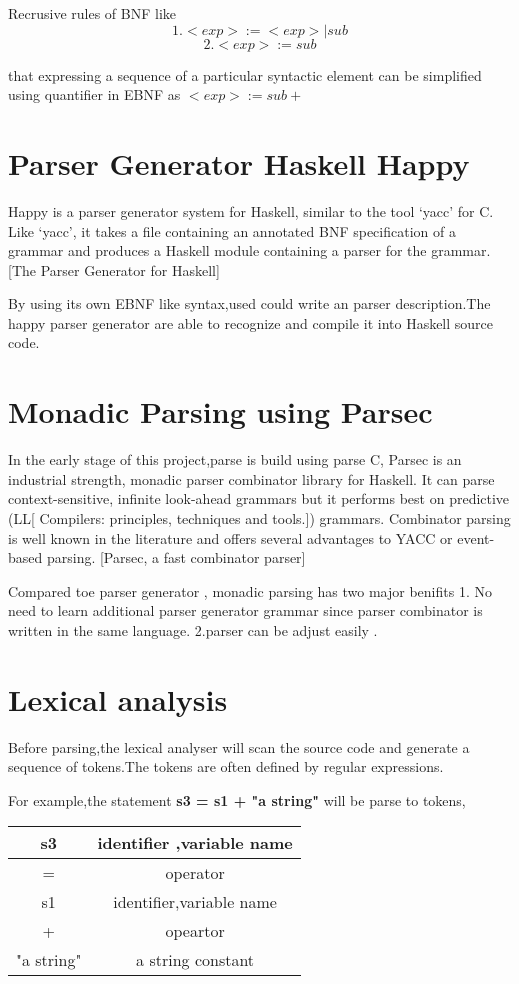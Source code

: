 Recrusive rules of BNF  like 
\[   1. <exp> := <exp> | sub \]
\[	 2. <exp> := sub     \]
 
that expressing a sequence of a particular syntactic element can be simplified using quantifier in EBNF as $ <exp>:=sub+ $



\section{Parser Generator Haskell Happy}
Happy is a parser generator system for Haskell, similar to the tool `yacc' for C. Like `yacc', it takes a file containing an annotated BNF specification of a grammar and produces a Haskell module containing a parser for the grammar.
[The Parser Generator for Haskell] 

By using its own EBNF like syntax,used could write an parser description.The happy parser generator are able to recognize and compile it into Haskell source code.


\section{Monadic Parsing using Parsec}
In the early stage of this project,parse is build using parse C,
Parsec is an industrial strength, monadic parser combinator library for Haskell. It can parse context-sensitive, infinite look-ahead grammars but it performs best on
predictive (LL[ Compilers: principles, techniques and tools.]) grammars. Combinator parsing is well known in the literature
and offers several advantages to YACC or event-based parsing. [Parsec, a fast combinator parser] 

Compared toe parser generator , monadic parsing has two major benifits
1. No need to learn additional parser generator grammar since parser combinator is written in the same language. 2.parser can be adjust easily .




\section {Lexical analysis}
Before parsing,the lexical analyser will scan the source code and generate a sequence of tokens.The tokens are often defined by regular expressions.

For example,the statement \textbf{s3 = s1 + "a string"} will be parse to tokens,

\begin{tabular}{|c|c|}
\hline s3 & identifier ,variable name \\ 
\hline = & operator \\ 
\hline s1 & identifier,variable name \\ 
\hline + & opeartor \\ 
\hline "a string" & a string constant \\ 
\hline 
\end{tabular} 


